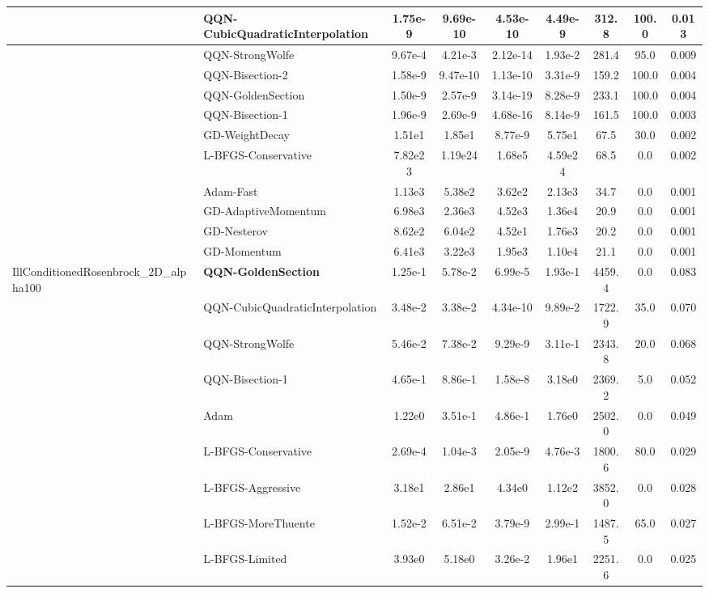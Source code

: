 \documentclass{article}
\begin{document}
\begin{longtable}{|l|l|c|c|c|c|c|c|c|}
\hline
 & QQN-CubicQuadraticInterpolation & 1.75e-9 & 9.69e-10 & 4.53e-10 & 4.49e-9 & 312.8 & 100.0 & 0.013 \\
\hline
 & QQN-StrongWolfe & 9.67e-4 & 4.21e-3 & 2.12e-14 & 1.93e-2 & 281.4 & 95.0 & 0.009 \\
\hline
 & QQN-Bisection-2 & 1.58e-9 & 9.47e-10 & 1.13e-10 & 3.31e-9 & 159.2 & 100.0 & 0.004 \\
\hline
 & QQN-GoldenSection & 1.50e-9 & 2.57e-9 & 3.14e-19 & 8.28e-9 & 233.1 & 100.0 & 0.004 \\
\hline
 & QQN-Bisection-1 & 1.96e-9 & 2.69e-9 & 4.68e-16 & 8.14e-9 & 161.5 & 100.0 & 0.003 \\
\hline
 & GD-WeightDecay & 1.51e1 & 1.85e1 & 8.77e-9 & 5.75e1 & 67.5 & 30.0 & 0.002 \\
\hline
 & L-BFGS-Conservative & 7.82e23 & 1.19e24 & 1.68e5 & 4.59e24 & 68.5 & 0.0 & 0.002 \\
\hline
 & Adam-Fast & 1.13e3 & 5.38e2 & 3.62e2 & 2.13e3 & 34.7 & 0.0 & 0.001 \\
\hline
 & GD-AdaptiveMomentum & 6.98e3 & 2.36e3 & 4.52e3 & 1.36e4 & 20.9 & 0.0 & 0.001 \\
\hline
 & GD-Nesterov & 8.62e2 & 6.04e2 & 4.52e1 & 1.76e3 & 20.2 & 0.0 & 0.001 \\
\hline
 & GD-Momentum & 6.41e3 & 3.22e3 & 1.95e3 & 1.10e4 & 21.1 & 0.0 & 0.001 \\
IllConditionedRosenbrock\_2D\_alpha100 & \textbf{QQN-GoldenSection} & 1.25e-1 & 5.78e-2 & 6.99e-5 & 1.93e-1 & 4459.4 & 0.0 & 0.083 \\
\hline
 & QQN-CubicQuadraticInterpolation & 3.48e-2 & 3.38e-2 & 4.34e-10 & 9.89e-2 & 1722.9 & 35.0 & 0.070 \\
\hline
 & QQN-StrongWolfe & 5.46e-2 & 7.38e-2 & 9.29e-9 & 3.11e-1 & 2343.8 & 20.0 & 0.068 \\
\hline
 & QQN-Bisection-1 & 4.65e-1 & 8.86e-1 & 1.58e-8 & 3.18e0 & 2369.2 & 5.0 & 0.052 \\
\hline
 & Adam & 1.22e0 & 3.51e-1 & 4.86e-1 & 1.76e0 & 2502.0 & 0.0 & 0.049 \\
\hline
 & L-BFGS-Conservative & 2.69e-4 & 1.04e-3 & 2.05e-9 & 4.76e-3 & 1800.6 & 80.0 & 0.029 \\
\hline
 & L-BFGS-Aggressive & 3.18e1 & 2.86e1 & 4.34e0 & 1.12e2 & 3852.0 & 0.0 & 0.028 \\
\hline
 & L-BFGS-MoreThuente & 1.52e-2 & 6.51e-2 & 3.79e-9 & 2.99e-1 & 1487.5 & 65.0 & 0.027 \\
\hline
 & L-BFGS-Limited & 3.93e0 & 5.18e0 & 3.26e-2 & 1.96e1 & 2251.6 & 0.0 & 0.025 \\

\end{longtable}
\end{document}

